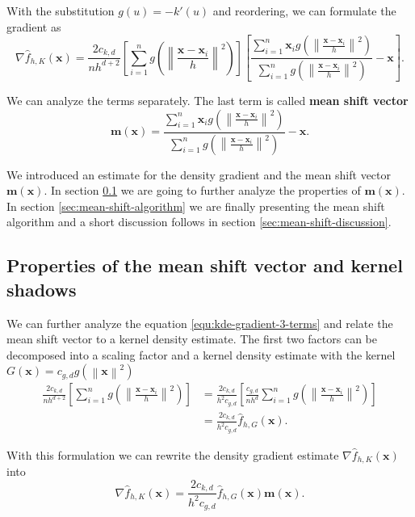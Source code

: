\documentclass{article}
\newcommand{\norm}[1]{\left\lVert#1\right\rVert}
\begin{document}
With the substitution $g(u) = -k'(u)$ and reordering, we can formulate the gradient as
\begin{equation}
	\nabla \hat{f}_{h,K}(\bm{x}) = \frac{2c_{k,d}}{nh^{d+2}} \left[\sum_{i=1}^n g\left(\norm{\frac{\bm{x} - \bm{x}_i}{h}}^2 \right)\right] \left[\frac{\sum_{i=1}^n \bm{x}_i g\left(\norm{\frac{\bm{x} - \bm{x}_i}{h}}^2 \right)}{\sum_{i=1}^n g\left(\norm{\frac{\bm{x} - \bm{x}_i}{h}}^2 \right)} - \bm{x}\right]\text{.}
	\label{equ:kde-gradient-3-terms}
\end{equation}

We can analyze the terms separately. The last term is called \textbf{mean shift vector}
\begin{equation}
	\bm{m}(\bm{x}) = \frac{\sum_{i=1}^n \bm{x}_i g\left(\norm{\frac{\bm{x} - \bm{x}_i}{h}}^2 \right)}{\sum_{i=1}^n g\left(\norm{\frac{\bm{x} - \bm{x}_i}{h}}^2 \right)} - \bm{x}\text{.}
\end{equation}

We introduced an estimate for the density gradient and the mean shift vector $\bm{m}(\bm{x})$. In section \ref{sec:mean-shift-vector-properties} we are going to further analyze the properties of $\bm{m}(\bm{x})$. In section \ref{sec:mean-shift-algorithm} we are finally presenting the mean shift algorithm and a short discussion follows in section \ref{sec:mean-shift-discussion}.


\subsection{Properties of the mean shift vector and kernel shadows} \label{sec:mean-shift-vector-properties}

We can further analyze the equation \ref{equ:kde-gradient-3-terms} and relate the mean shift vector to a kernel density estimate. The first two factors can be decomposed into a scaling factor and a kernel density estimate with the kernel $G(\bm{x}) = c_{g,d} g(\norm{\bm{x}}^2)$
\begin{align}
	\frac{2c_{k,d}}{nh^{d+2}} \left[\sum_{i=1}^n g\left(\norm{\frac{\bm{x} - \bm{x}_i}{h}}^2 \right)\right] &= \frac{2c_{k,d}}{h^2c_{g,d}} \left[\frac{c_{g,d}}{nh^d} \sum_{i=1}^n g\left(\norm{\frac{\bm{x} - \bm{x}_i}{h}}^2 \right) \right]\\
	&= \frac{2c_{k,d}}{h^2c_{g,d}} \hat{f}_{h,G}(\bm{x})\text{.}
\end{align}

With this formulation we can rewrite the density gradient estimate $\nabla \hat{f}_{h,K}(\bm{x})$ into
\begin{equation}
	\nabla \hat{f}_{h,K}(\bm{x}) = \frac{2c_{k,d}}{h^2c_{g,d}} \hat{f}_{h,G}(\bm{x}) \bm{m}(\bm{x})\text{.}
\end{equation}
\end{document}
